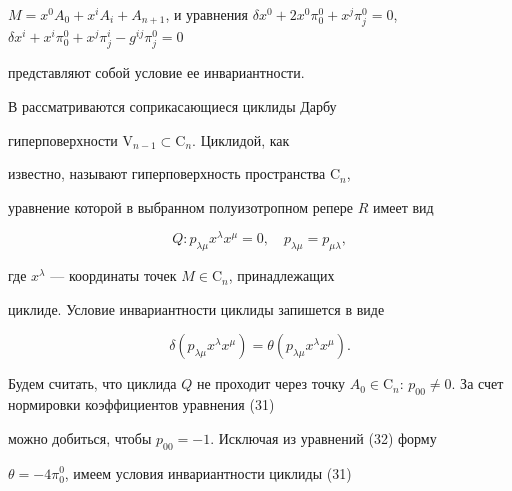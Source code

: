 $M=x^0A_0+x^i A_i+A_{n+1}$, и уравнения $\delta x^0+2x^0\pi^0_0+x^j 


\pi^0_j=0$, $\delta x^i+x^i\pi^0_0+x^j\pi^i_j-g^{i j}\pi^0_j=0$ 


представляют собой условие ее инвариантности. 


 


В \cite{9} рассматриваются соприкасающиеся циклиды Дарбу 


гиперповерхности $\mathrm V_{n-1}\subset\mathrm C_n$. Циклидой, как 


известно, называют гиперповерхность пространства $\mathrm C_n$, 


уравнение которой в выбранном полуизотропном репере $R$ имеет вид 


\begin{equation} 


Q:p_{\lambda\mu}x^\lambda x^\mu=0,\quad 


p_{\lambda\mu}=p_{\mu\lambda}, 


\end{equation} 


где $x^\lambda$ --- координаты точек $M\in\mathrm C_n$, принадлежащих 


циклиде. Условие инвариантности циклиды запишется в виде 


\begin{equation} 


\delta(p_{\lambda\mu}x^\lambda x^\mu)=\theta


(p_{\lambda\mu}x^\lambda x^\mu). 


\end{equation} 


Будем считать, что циклида $Q$ не проходит через точку $A_0\in\mathrm 


C_n$: $p_{00}\ne0$. За счет нормировки коэффициентов уравнения (31) 


можно добиться, чтобы $p_{00}=-1$. Исключая из уравнений (32) форму 


$\theta=-4\pi^0_0$, имеем условия инвариантности циклиды (31)


